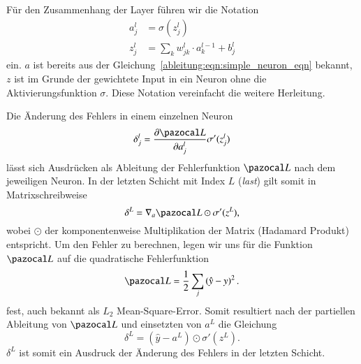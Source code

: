 Für den Zusammenhang der Layer führen wir die Notation
\begin{equation}
	\begin{split}
		a^l_j &= \sigma(z^l_j) \\
		z^l_j &= \sum\limits_{k}w^{l}_{jk} \cdot a^{l-1}_{k}+b^{l}_{j}
	\end{split}
\end{equation}
ein.
$a$ ist bereits aus der Gleichung~\eqref{ableitung:eqn:simple_neuron_eqn}
bekannt, $z$ ist im Grunde der gewichtete Input in ein Neuron
ohne die Aktivierungsfunktion $\sigma$.
Diese Notation vereinfacht die weitere Herleitung.

Die Änderung des Fehlers in einem einzelnen Neuron
\begin{equation}
	\delta^{l}_{j} = \frac{\partial \Lb}{\partial a^{l}_{j}} \sigma'(z^l_j)
\end{equation}
lässt sich Ausdrücken als Ableitung der Fehlerfunktion $\Lb$ nach dem jeweiligen Neuron.
In der letzten Schicht mit Index $L$ ({\em last}) gilt somit in
Matrixschreibweise
\begin{equation}
	\delta^{L} = \nabla_a \Lb \odot \sigma'(z^L) \text{,}
\end{equation}
wobei $\odot$ der komponentenweise Multiplikation der Matrix (Hadamard
Produkt) entspricht.
%
Um den Fehler zu berechnen, legen wir uns für die Funktion $\Lb$ auf
die quadratische Fehlerfunktion
\begin{equation}
	\Lb = \frac{1}{2} \sum_j \left( \hat{y} - y \right)^2 \text{.}
\end{equation}
fest, auch bekannt als 
$L_2$ Mean-Square-Error.
Somit resultiert nach der partiellen Ableitung von $\Lb$ und
einsetzten von $a^L$ die Gleichung
\begin{equation}
	\delta^{L} = (\hat{y} - a^L) \odot \sigma'(z^L).
\end{equation}
$\delta^L$ ist somit ein Ausdruck der Änderung des Fehlers in der
letzten Schicht.


